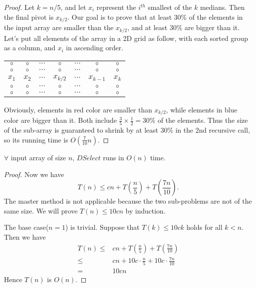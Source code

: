 \begin{proof}
Let $k=n/5$, and let $x_i$ represent the $i^{th}$ smallest of the $k$ medians. Then the final pivot is $x_{k/2}$. Our goal is to prove that at least 30\% of the elements in the input array are smaller than the $x_{k/2}$, and at least 30\% are bigger than it. Let's put all elements of the array in a 2D grid as follow, with each sorted group as a column, and $x_i$ in ascending order. 
\begin{table}[H]
\centering
\begin{tabular}{ccccccc}
{\color{red}$\circ$}&{\color{red}$\circ$}&{\color{red}$\cdots$}&{\color{red}$\circ$}&$\cdots$&$\circ$&$\circ$
\\
{\color{red}$\circ$}&{\color{red}$\circ$}&{\color{red}$\cdots$}&{\color{red}$\circ$}&$\cdots$&$\circ$&$\circ$
\\
{\color{red}$x_1$}&{\color{red}$x_2$}&{\color{red}$\cdots$}&$x_{k/2}$&{\color{blue}$\cdots$}&{\color{blue}$x_{k-1}$}&{\color{blue}$x_k$}\\
$\circ$&$\circ$&$\cdots$&{\color{blue}$\circ$}&{\color{blue}$\cdots$}&{\color{blue}$\circ$}&{\color{blue}$\circ$}\\
$\circ$&$\circ$&$\cdots$&{\color{blue}$\circ$}&{\color{blue}$\cdots$}&{\color{blue}$\circ$}&{\color{blue}$\circ$}
\end{tabular}
\end{table}
Obviously, elements in red color are smaller than $x_{k/2}$, while elements in blue color are bigger than it. Both include $\frac{3}{5}\times\frac{1}{2}=30\%$ of the elements. Thus the size of the sub-array is guaranteed to shrink by at least 30\% in the 2nd recursive call, so its running time is $O(\frac{7}{10}n)$.
\end{proof}
\begin{theorem}
$\forall$ input array of size $n$, $DSelect$ runs in $O(n)$ time.
\end{theorem}
\begin{proof}
Now we have 
\begin{equation*}
T(n)\leq cn+T\left(\frac{n}{5}\right)+T\left(\frac{7n}{10}\right).
\end{equation*}
The master method is not applicable because the two sub-problems are not of the same size. We will prove $T(n)\leq 10cn$ by induction.

The base case($n=1$) is trivial. Suppose that $T(k)\leq 10ck$ holds for all $k<n$. Then we have 
\begin{align*}
T(n)\leq&cn+T\left(\frac{n}{5}\right)+T\left(\frac{7n}{10}\right)\\
\leq&cn+10c\cdot\frac{n}{5}+10c\cdot\frac{7n}{10}\\
=&10cn
\end{align*} 
Hence $T(n)$ is $O(n)$.
\end{proof}
